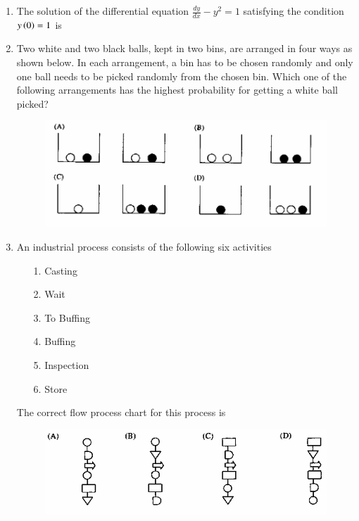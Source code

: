 \documentclass[journal,12pt,onecolumn]{IEEEtran}
\theoremstyle{remark}
\begin{document}
\begin{enumerate}
\item The solution of the differential equation $\frac{dy}{dx} - y^2 = 1$ satisfying the condition $y\left(0\right)=1$ is
\hfill{}
\begin{enumerate}
\end{enumerate}

\item Two white and two black balls, kept in two bins, are arranged in four ways as shown below. In each arrangement, a bin has to be chosen randomly and only one ball needs to be picked randomly from the chosen bin. Which one of the following arrangements has the highest probability for getting a white ball picked?
\hfill{}

\begin{figure}[H]
\centering
\includegraphics[width=0.8\columnwidth]{q44.png}
\caption*{}
\label{fig:q44}
\end{figure}


\item An industrial process consists of the following six activities
\begin{enumerate}
    \item[1.] Casting
    \item[2.] Wait
    \item[3.] To Buffing
    \item[4.] Buffing
    \item[5.] Inspection
    \item[6.] Store
\end{enumerate}
The correct flow process chart for this process is
\hfill{}

\begin{figure}[H]
\centering
\includegraphics[width=0.6\columnwidth]{q45.png}
\caption*{}
\label{fig:q45}
\end{figure}



\end{enumerate}
\end{document}
